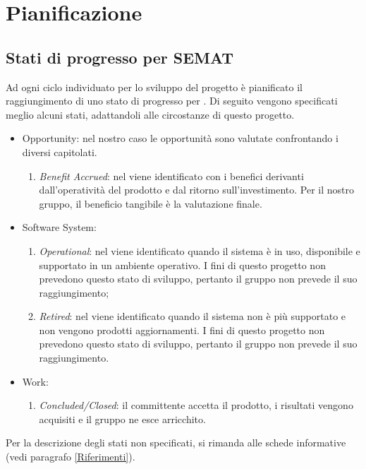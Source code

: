 \section{Pianificazione}
\label{pianificazione}

	\subsection{Stati di progresso per SEMAT}

Ad ogni ciclo individuato per lo sviluppo del progetto è pianificato il raggiungimento di uno stato di progresso per . Di seguito vengono specificati meglio alcuni stati, adattandoli alle circostanze di questo progetto.

\begin{itemize}
	\item Opportunity: nel nostro caso le opportunità sono valutate confrontando i diversi capitolati.
	\begin{enumerate}
		\item \textit{Benefit Accrued}: nel  viene identificato con i benefici derivanti dall'operatività del prodotto e dal ritorno sull'investimento. Per il nostro gruppo, il beneficio tangibile è la valutazione finale.
	\end{enumerate}
	\item Software System:
	\begin{enumerate}
		\item \textit{Operational}: nel  viene identificato quando il sistema è in uso, disponibile e supportato in un ambiente operativo. I fini di questo progetto non prevedono questo stato di sviluppo, pertanto il gruppo non prevede il suo raggiungimento;
		\item \textit{Retired}: nel  viene identificato quando il sistema non è più supportato e non vengono prodotti aggiornamenti. I fini di questo progetto non prevedono questo stato di sviluppo, pertanto il gruppo non prevede il suo raggiungimento.
	\end{enumerate}
	\item Work:
	\begin{enumerate}
		\item \textit{Concluded/Closed}: il committente accetta il prodotto, i risultati vengono acquisiti e il gruppo ne esce arricchito. 
	\end{enumerate}
\end{itemize}

Per la descrizione degli stati non specificati, si rimanda alle schede informative (vedi paragrafo \ref{Riferimenti}).


